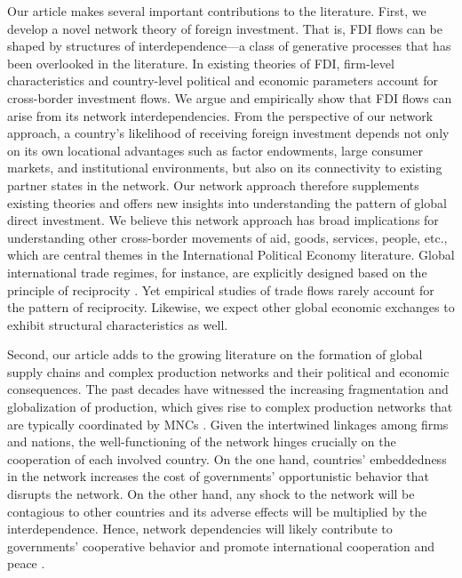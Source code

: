 \documentclass[reqno,onecolumn,letterpaper,12pt]{article}
\begin{document}
Our article makes several important contributions to the literature. First, we develop a novel network theory of foreign investment. That is, FDI flows can be shaped by structures of interdependence---a class of generative processes that has been overlooked in the literature. In existing theories of FDI, firm-level characteristics and country-level political and economic parameters account for cross-border investment flows. We argue and empirically show that FDI flows can arise from its network interdependencies. From the perspective of our network approach, a country's likelihood of receiving foreign investment depends not only on its own locational advantages such as factor endowments, large consumer markets, and institutional environments, but also on its connectivity to existing partner states in the network. Our network approach therefore supplements existing theories and offers new insights into understanding the pattern of global direct investment. We believe this network approach has broad implications for understanding other cross-border movements of aid, goods, services, people, etc., which are central themes in the International Political Economy literature. Global international trade regimes, for instance, are explicitly designed based on the principle of reciprocity \citep{Bagwell_Staiger:1999}. Yet empirical studies of trade flows rarely account for the pattern of reciprocity. Likewise, we expect other global economic exchanges to exhibit structural characteristics as well. %


Second, our article adds to the growing literature on the formation of global supply chains and complex production networks and their political and economic consequences. The past decades have witnessed the increasing fragmentation and globalization of production, which gives rise to complex production networks that are typically coordinated by MNCs \citep{UNCTAD:2013}. Given the intertwined linkages among firms and nations, the well-functioning of the network hinges crucially on the cooperation of each involved country. On the one hand, countries' embeddedness in the network increases the cost of governments' opportunistic behavior that disrupts the network. On the other hand, any shock to the network will be contagious to other countries and its adverse effects will be multiplied by the interdependence. Hence, network dependencies will likely contribute to governments' cooperative behavior \citep[see~e.g.,][]{johns2016under} and promote international cooperation and peace \citep[see~e.g.,][]{Dorussen_Ward:2008,Dorussen_Ward:2010,Kim_Solingen:2017}.
\end{document}

